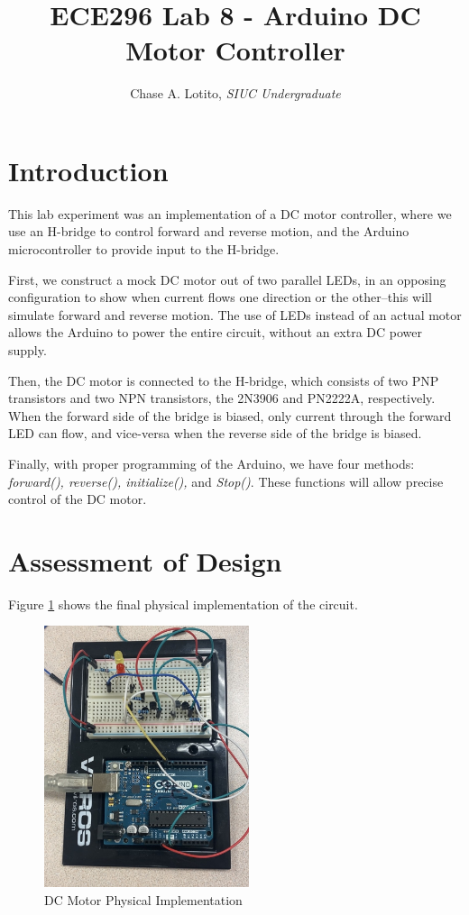 \documentclass{IEEEtran}
\title{ECE296 Lab 8 - Arduino DC Motor Controller}
\author{Chase A. Lotito, \textit{SIUC Undergraduate}}
\date{}
\begin{document}
\maketitle %

\section{Introduction} 

This lab experiment was an implementation of a DC motor controller, where we use an H-bridge to control forward and reverse motion, and the Arduino microcontroller to provide input to the H-bridge.

First, we construct a mock DC motor out of two parallel LEDs, in an opposing configuration to show when current flows one direction or the other--this will simulate forward and reverse motion. The use of LEDs instead of an actual motor allows the Arduino to power the entire circuit, without an extra DC power supply. 

Then, the DC motor is connected to the H-bridge, which consists of two PNP transistors and two NPN transistors, the 2N3906 and PN2222A, respectively. When the forward side of the bridge is biased, only current through the forward LED can flow, and vice-versa when the reverse side of the bridge is biased.

Finally, with proper programming of the Arduino, we have four methods: \textit{forward(), reverse(), initialize(),} and \textit{Stop()}. These functions will allow precise control of the DC motor.

\section{Assessment of Design}

Figure \ref{fig:design} shows the final physical implementation of the circuit. 

\begin{figure}[!ht] 
    \centering
    \includegraphics[width = 6cm]{dcmotordesign.jpeg}
    \caption{DC Motor Physical Implementation}
    \label{fig:design}
\end{figure}
\end{document}
